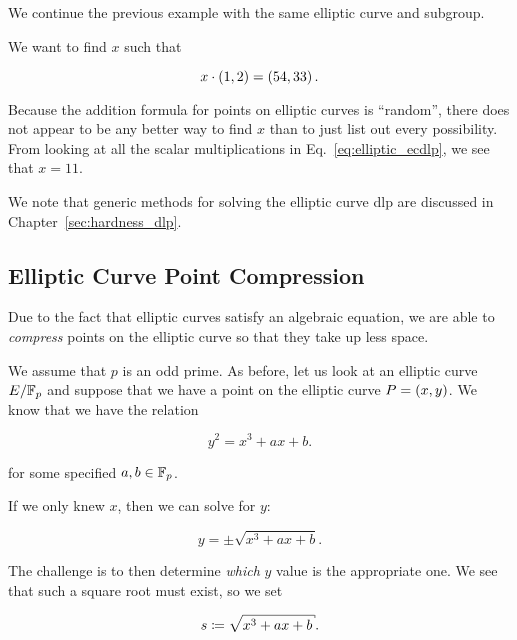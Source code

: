 \begin{example}
We continue the previous example with the same \gls{elliptic curve}
and \gls{subgroup}.

We want to find $x$ such that

\begin{equation}
    x\cdot\left( 1,2 \right) = \left( 54,33 \right).
\end{equation}

\noindent
Because the addition formula for points on \glspl{elliptic curve} is ``random'',
there does not appear to be any better way to find
$x$ than to just list out every possibility.
From looking at all the scalar multiplications
in Eq.~\eqref{eq:elliptic_ecdlp},
we see that $x = 11$.
\end{example}

We note that generic methods for solving the \gls{elliptic curve} \gls{dlp}
are discussed in Chapter~\ref{sec:hardness_dlp}.


\subsection{Elliptic Curve Point Compression}
\label{ssec:ec_point_compression}

Due to the fact that \glspl{elliptic curve} satisfy an algebraic equation,
we are able to \emph{compress} points on the \gls{elliptic curve}
so that they take up less space.

We assume that $p$ is an odd prime.
As before, let us look at an \gls{elliptic curve} $E/\mathbb{F}_{p}$
and suppose that we have a point on the \gls{elliptic curve}
$P = \left( x,y \right)$.
We know that we have the relation

\begin{equation}
    y^{2} = x^{3} + ax + b.
\end{equation}

\noindent
for some specified $a,b\in\mathbb{F}_{p}$.

If we only knew $x$, then we can solve for $y$:

\begin{equation}
    y = \pm\sqrt{x^{3} + ax + b}.
\end{equation}

\noindent
The challenge is to then determine \emph{which} $y$ value
is the appropriate one.
We see that such a square root must exist, so we set

\begin{equation}
    s \mathDef{} \sqrt{x^{3} + ax + b}.
    \label{eq:ec_compress_sqrt}
\end{equation}

